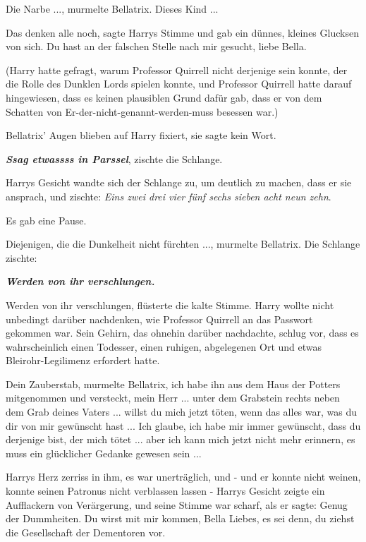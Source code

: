 \glqq{}Die Narbe ...\grqq{}, murmelte Bellatrix. \glqq{}Dieses Kind ...\grqq{}

\glqq{}Das denken alle noch\grqq{}, sagte Harrys Stimme und gab ein dünnes,
kleines Glucksen von sich. \glqq{}Du hast an der falschen Stelle nach mir
gesucht, liebe Bella.\grqq{}

(Harry hatte gefragt, warum Professor Quirrell nicht derjenige sein konnte, der
die Rolle des Dunklen Lords spielen konnte, und Professor Quirrell hatte darauf
hingewiesen, dass es keinen plausiblen Grund dafür gab, dass er von dem Schatten
von Er-der-nicht-genannt-werden-muss besessen war.)

Bellatrix' Augen blieben auf Harry fixiert, sie sagte kein Wort.

\glqq{}\textbf{\emph{Ssag etwassss in Parssel}}\grqq{}, zischte die Schlange.

Harrys Gesicht wandte sich der Schlange zu, um deutlich zu machen, dass er sie
ansprach, und zischte: \glqq{}\emph{Eins zwei drei vier fünf sechs sieben acht
neun zehn}.\grqq{}

Es gab eine Pause.

\glqq{}Diejenigen, die die Dunkelheit nicht fürchten ...\grqq{}, murmelte
Bellatrix. Die Schlange zischte:

\glqq{}\textbf{\emph{Werden von ihr verschlungen.}}\grqq{}

\glqq{}Werden von ihr verschlungen\grqq{}, flüsterte die kalte Stimme. Harry
wollte nicht unbedingt darüber nachdenken, wie Professor Quirrell an das
Passwort gekommen war. Sein Gehirn, das ohnehin darüber nachdachte, schlug vor,
dass es wahrscheinlich einen Todesser, einen ruhigen, abgelegenen Ort und etwas
Bleirohr-Legilimenz erfordert hatte.

\glqq{}Dein Zauberstab\grqq{}, murmelte Bellatrix, \glqq{}ich habe ihn aus dem
Haus der Potters mitgenommen und versteckt, mein Herr ... unter dem Grabstein
rechts neben dem Grab deines Vaters ... willst du mich jetzt töten, wenn das
alles war, was du dir von mir gewünscht hast ... Ich glaube, ich habe mir immer
gewünscht, dass du derjenige bist, der mich tötet ... aber ich kann mich jetzt
nicht mehr erinnern, es muss ein glücklicher Gedanke gewesen sein ...\grqq{}

Harrys Herz zerriss in ihm, es war unerträglich, und - und er konnte nicht
weinen, konnte seinen Patronus nicht verblassen lassen - Harrys Gesicht zeigte
ein Aufflackern von Verärgerung, und seine Stimme war scharf, als er sagte:
\glqq{}Genug der Dummheiten. Du wirst mit mir kommen, Bella Liebes, es sei denn,
du ziehst die Gesellschaft der Dementoren vor.\grqq{}

